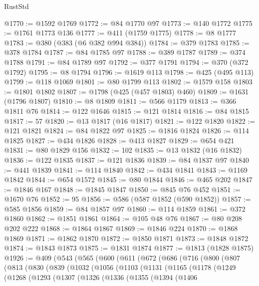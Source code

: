 \begin{lexlean}{RustStd}
\begin{coremodule}
{\begin{coremodule}
{{{{{{{{{{{{{{{{{{{{{{{{{{{{{{{{{{{{{{{{{{{{{{{{{{{{{@1770 := @1592 @1769
@1772 := @84 @1770 @97
@1773 := @140 @1772
@1775 := @1761 @1773 @136
@1777 := @411 (@1759 @1775)
@1778 := @8 @1777
@1783 := @380 (@383 (@6 @382 @994 @384))
@1784 := @379 @1783
@1785 := @378 @1784
@1787 := @84 @1785 @97
@1788 := @389 @1787
@1789 := @374 @1788
@1791 := @84 @1789 @97
@1792 := @377 @1791
@1794 := @370 (@372 @1792)
@1795 := @8 @1794
@1796 := @1619 @113
@1798 := @425 (@495 @113)
@1799 := @118 @1069
@1801 := @80 @1799 @113
@1802 := @1579 @158
@1803 := @1801 @1802
@1807 := @1798 (@425 (@457 @1803) @460)
@1809 := @1631 (@1796 @1807)
@1810 := @8 @1809
@1811 := @566 @1179
@1813 := @366 @1811 @76
@1814 := @122 @1646
@1815 := @121 @1814
@1816 := @84 @1815
@1817 := 57
@1820 := @13 @1817 (@16 @1817)
@1821 := @122 @1820
@1822 := @121 @1821
@1824 := @84 @1822 @97
@1825 := @1816 @1824
@1826 := @114 @1825
@1827 := @434 @1826
@1828 := @413 @1827
@1829 := @654 @421
@1831 := @80 @1829 @156
@1832 := 102
@1835 := @13 @1832 (@16 @1832)
@1836 := @122 @1835
@1837 := @121 @1836
@1839 := @84 @1837 @97
@1840 := @441 @1839
@1841 := @114 @1840
@1842 := @434 @1841
@1843 := @1169 @1842
@1844 := @654 @1572
@1845 := @80 @1844
@1846 := @465 @202
@1847 := @1846 @167
@1848 := @1845 @1847
@1850 := @845 @76 @452
@1851 := @1670 @76
@1852 := 95
@1856 := @586 (@587 @1852 (@590 @1852))
@1857 := @585 @1856
@1859 := @84 @1857 @97
@1860 := @114 @1859
@1861 := @372 @1860
@1862 := @1851 @1861
@1864 := @105 @48 @76
@1867 := @80 @208 @202 @222
@1868 := @1864 @1867
@1869 := @1846 @224
@1870 := @1868 @1869
@1871 := @1862 @1870
@1872 := @1850 @1871
@1873 := @1848 @1872
@1874 := @1843 @1873
@1875 := @1831 @1874
@1877 := @1813 (@1828 @1875)
@1926 := @409
    (@543
      (@565
        (@600
          (@611
            (@672
              (@686
                (@716
                  (@800
                    (@807
                      (@813
                        (@830
                          (@839
                            (@1032
                              (@1056
                                (@1103
                                  (@1131
                                    (@1165
                                      (@1178
                                        (@1249
                                          (@1268
                                            (@1293
                                              (@1307
                                                (@1326
                                                  (@1336
                                                    (@1355
                                                      (@1394
                                                        (@1406
}}}}}}}}}}}}}}}}}}}}}}}}}}}}}}}}}}}}}}}}}}}}}}}}}}}}}
\end{coremodule}}
\end{coremodule}
\end{lexlean}
